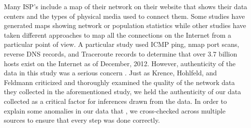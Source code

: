 \documentclass{sigcomm-alternate}
\begin{document}
Many ISP's include a map of their network on their website that shows their data centers and the types of physical media used to connect them. Some studies have generated maps showing network or population statistics while other studies have taken different approaches to map all the connections on the Internet from a particular point of view. A particular study used ICMP ping, nmap port scans, reverse DNS records, and Traceroute records to determine that over 3.7 billion hosts exist on the Internet as of December, 2012. However, authenticity of the data in this study was a serious concern \cite{botnet}. Just as Krence, Hohlfeld, and Feldmann criticized and thoroughly examined the quality of the network data they collected in the aforementioned study, we held the authenticity of our data collected as a critical factor for inferences drawn from the data. In order to explain some anomalies in our data that , we cross-checked across multiple sources to ensure that every step was done correctly. 


					
\end{document}
